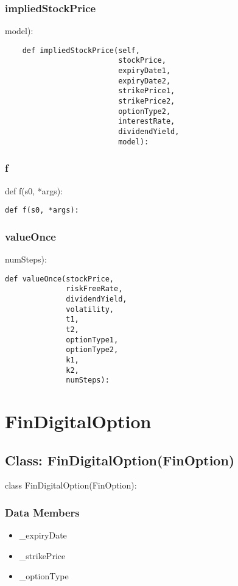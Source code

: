 \documentclass[twoside,11pt]{book}
\begin{document}
\subsubsection*{{\bf impliedStockPrice}}
model): 

\begin{lstlisting}
    def impliedStockPrice(self,
                          stockPrice,
                          expiryDate1,
                          expiryDate2,
                          strikePrice1,
                          strikePrice2,
                          optionType2,
                          interestRate,
                          dividendYield,
                          model):
\end{lstlisting}

\subsubsection*{{\bf f}}
def f(s0, *args): 

\begin{lstlisting}
def f(s0, *args):
\end{lstlisting}

\subsubsection*{{\bf valueOnce}}
numSteps): 

\begin{lstlisting}
def valueOnce(stockPrice,
              riskFreeRate,
              dividendYield,
              volatility,
              t1,
              t2,
              optionType1,
              optionType2,
              k1,
              k2,
              numSteps):
\end{lstlisting}

\newpage
\section{FinDigitalOption}

\subsection*{Class: FinDigitalOption(FinOption)}
class FinDigitalOption(FinOption): 

\subsubsection*{Data Members}
\begin{itemize}
\item{\_expiryDate}
\item{\_strikePrice}
\item{\_optionType}
\end{itemize}
\end{document}
